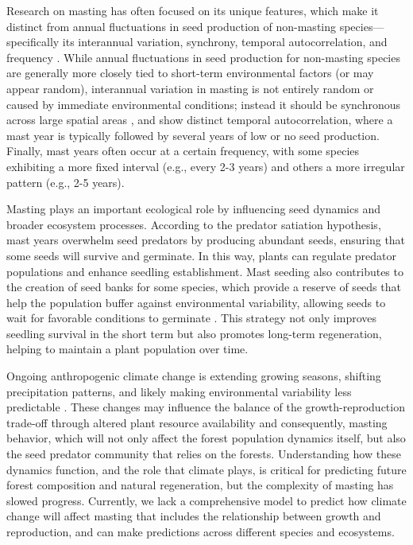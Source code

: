 \documentclass[11pt,letter]{article}
\begin{document}
Research on masting has often focused on its unique features, which make it distinct from annual fluctuations in seed production of non-masting species---specifically its interannual variation, synchrony, temporal autocorrelation, and frequency \citep{hacket2021climate}. While annual fluctuations in seed production for non-masting species are generally more closely tied to short-term environmental factors (or may appear random), interannual variation in masting is not entirely random or caused by immediate environmental conditions; instead it should be synchronous across large spatial areas \citep[e.g., hundreds of kilometers,][]{kelly1994evolutionary}, and show distinct temporal autocorrelation, where a mast year is typically followed by several years of low or no seed production. Finally, mast years often occur at a certain frequency, with some species exhibiting a more fixed interval (e.g., every 2-3 years) and others a more irregular pattern (e.g., 2-5 years).

Masting plays an important ecological role by influencing seed dynamics and broader ecosystem processes. According to the predator satiation hypothesis, mast years overwhelm seed predators by producing abundant seeds, ensuring that some seeds will survive and germinate. In this way, plants can regulate predator populations and enhance seedling establishment. Mast seeding also contributes to the creation of seed banks for some species, which provide a reserve of seeds that help the population buffer against environmental variability, allowing seeds to wait for favorable conditions to germinate \citep{venable1989modeling}. This strategy not only improves seedling survival in the short term but also promotes long-term regeneration, helping to maintain a plant population over time.

Ongoing anthropogenic climate change is extending growing seasons, shifting precipitation patterns, and likely making environmental variability less predictable  \citep{calvin2023ipcc}. These changes may influence the balance of the growth-reproduction trade-off through altered plant resource availability and consequently, masting behavior, which will not only affect the forest population dynamics itself, but also the seed predator community that relies on the forests. Understanding how these dynamics function, and the role that climate plays, is critical for predicting future forest composition and natural regeneration, but the complexity of masting has slowed progress. Currently, we lack a comprehensive model to predict how climate change will affect masting that includes the relationship between growth and reproduction, and can make predictions across different species and ecosystems.
\end{document}
